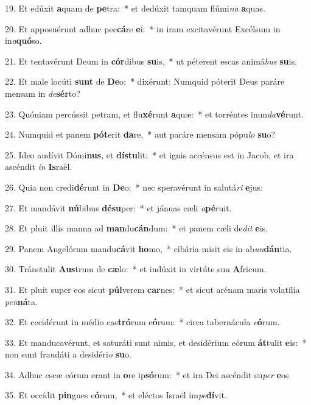 19. Et edúxit \textbf{a}quam de \textbf{pe}tra:~*  et dedúxit tamquam flúmi\textit{na} \textbf{a}quas.\

20. Et apposuérunt adhuc pec\textbf{cá}re \textbf{e}i:~*  in iram excitavérunt Excélsum in in\textit{a}\textbf{quó}so.\

21. Et tentavérunt Deum in \textbf{cór}dibus \textbf{su}is,~*  ut péterent escas animá\textit{bus} \textbf{su}is.\

22. Et male locúti \textbf{sunt} de \textbf{De}o:~*  dixérunt: Numquid póterit Deus paráre mensam in \textit{de}\textbf{sér}to?\

23. Quóniam percússit petram, et flu\textbf{xé}runt \textbf{a}quæ:~*  et torréntes inun\textit{da}\textbf{vé}runt.\

24. Numquid et panem \textbf{pót}erit \textbf{da}re,~*  aut paráre mensam pópu\textit{lo} \textbf{su}o?\

25. Ideo audívit Dómi\textbf{nus}, et \textbf{dís}\textbf{tu}lit:~*  et ignis accénsus est in Jacob, et ira ascéndit \textit{in} \textbf{Is}raël.\

26. Quia non credi\textbf{dé}runt in \textbf{De}o:~*  nec speravérunt in salutá\textit{ri} \textbf{e}jus:\

27. Et mandávit \textbf{nú}bibus \textbf{dé}\textbf{su}per:~*  et jánuas cæli \textit{a}\textbf{pé}ruit.\

28. Et pluit illis manna ad \textbf{man}du\textbf{cán}dum:~*  et panem cæli de\textit{dit} \textbf{e}is.\

29. Panem Angelórum mandu\textbf{cá}vit \textbf{ho}mo,~*  cibária misit eis in ab\textit{un}\textbf{dán}tia.\

30. Tránstulit \textbf{Aus}trum de \textbf{cæ}lo:~*  et indúxit in virtúte su\textit{a} \textbf{A}fricum.\

31. Et pluit super eos sicut \textbf{púl}verem \textbf{car}nes:~*  et sicut arénam maris volatília \textit{pen}\textbf{ná}ta.\

32. Et cecidérunt in médio cas\textbf{tró}rum e\textbf{ó}rum:~*  circa tabernácula \textit{e}\textbf{ó}rum.\

33. Et manducavérunt, et saturáti sunt nimis, et desidérium eórum \textbf{át}tulit \textbf{e}is:~*  non sunt fraudáti a desidéri\textit{o} \textbf{su}o.\

34. Adhuc escæ eórum erant in \textbf{o}re ip\textbf{só}rum:~*  et ira Dei ascéndit su\textit{per} \textbf{e}os\

35. Et occídit \textbf{pin}gues e\textbf{ó}rum,~*  et eléctos Israël im\textit{pe}\textbf{dí}vit.\

